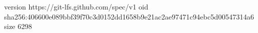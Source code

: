 version https://git-lfs.github.com/spec/v1
oid sha256:406600e089bbf39f70c3d0152dd1658b9e21ac2ae97471c94ebc5d00547314a6
size 6298
